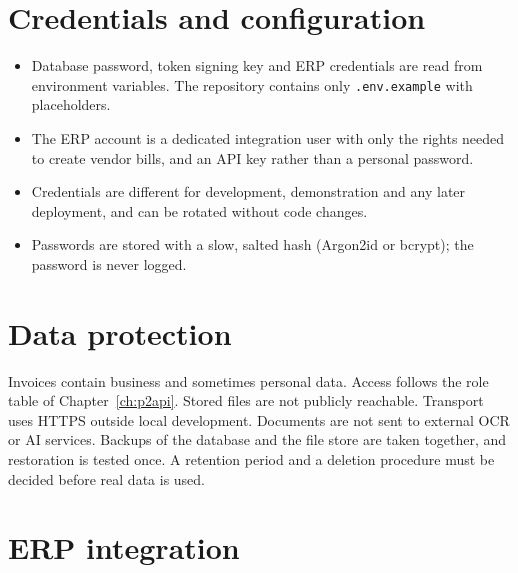 \documentclass[11pt,a4paper]{report}
\begin{document}
\section{Credentials and configuration}
\begin{itemize}
\item Database password, token signing key and ERP credentials are read from environment variables. The repository contains only \texttt{.env.example} with placeholders.
\item The ERP account is a dedicated integration user with only the rights needed to create vendor bills, and an API key rather than a personal password.
\item Credentials are different for development, demonstration and any later deployment, and can be rotated without code changes.
\item Passwords are stored with a slow, salted hash (Argon2id or bcrypt); the password is never logged.
\end{itemize}

\section{Data protection}
Invoices contain business and sometimes personal data. Access follows the role table of Chapter~\ref{ch:p2api}. Stored files are not publicly reachable. Transport uses HTTPS outside local development. Documents are not sent to external OCR or AI services. Backups of the database and the file store are taken together, and restoration is tested once. A retention period and a deletion procedure must be decided before real data is used.

\section{ERP integration}
\end{document}
